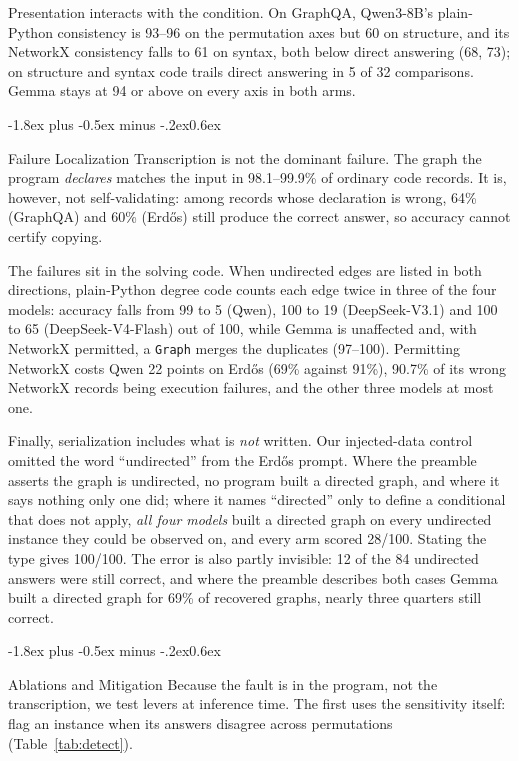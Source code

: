 \documentclass[11pt]{article}
\makeatletter
\renewcommand\subsection{\@startsection{subsection}{2}{\z@}
  {-1.8ex plus -0.5ex minus -.2ex}{0.6ex}
  {\normalsize\bfseries\raggedright}}
\makeatother
\begin{document}
Presentation interacts with the condition. On GraphQA, Qwen3-8B's plain-Python
consistency is 93--96 on the permutation axes but 60 on structure, and its NetworkX
consistency falls to 61 on syntax, both below direct answering (68, 73); on
structure and syntax code trails direct answering in 5 of 32 comparisons. Gemma
stays at 94 or above on every axis in both arms.

\subsection{Failure Localization}
Transcription is not the dominant failure. The graph the program \emph{declares}
matches the input in 98.1--99.9\% of ordinary code records. It is, however, not
self-validating: among records whose declaration is wrong, 64\% (GraphQA) and 60\%
(Erd\H{o}s) still produce the correct answer, so accuracy cannot certify copying.

The failures sit in the solving code. When undirected edges are listed in both
directions, plain-Python degree code counts each edge twice in three of the four
models: accuracy falls from 99 to 5 (Qwen), 100 to 19 (DeepSeek-V3.1) and 100 to 65
(DeepSeek-V4-Flash) out of 100, while Gemma is unaffected and, with NetworkX
permitted, a \texttt{Graph} merges the duplicates (97--100). Permitting NetworkX costs
Qwen 22 points on Erd\H{o}s (69\% against 91\%), 90.7\% of its wrong NetworkX records
being execution failures, and the other three models at most one.

Finally, serialization includes what is \emph{not} written. Our injected-data
control omitted the word ``undirected'' from the Erd\H{o}s prompt. Where
the preamble asserts the graph is undirected, no program built a directed graph, and
where it says nothing only one did; where it names ``directed'' only to define a
conditional that does not apply, \emph{all four models} built a directed graph on
every undirected instance they could be observed on, and every arm scored 28/100.
Stating the type gives 100/100. The error is also partly invisible: 12 of the 84 undirected
answers were still correct, and where the preamble describes both cases Gemma built
a directed graph for 69\% of recovered graphs, nearly three quarters still correct.

\subsection{Ablations and Mitigation}
Because the fault is in the program, not the transcription, we test levers at
inference time. The first uses the sensitivity itself: flag an instance when its
answers disagree across permutations (Table~\ref{tab:detect}).
\end{document}
